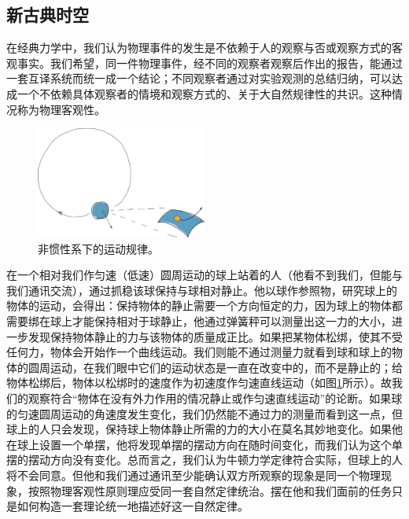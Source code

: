 \documentclass[main.tex]{subfiles}
\begin{document}
\subsection{新古典时空}
在经典力学中，我们认为物理事件的发生是不依赖于人的观察与否或观察方式的客观事实。我们希望，同一件物理事件，经不同的观察者观察后作出的报告，能通过一套互译系统而统一成一个结论；不同观察者通过对实验观测的总结归纳，可以达成一个不依赖具体观察者的情境和观察方式的、关于大自然规律性的共识。这种情况称为物理客观性\cite{Reiss2020}。

\begin{figure}[h]
    \centering
    \includegraphics[width=0.5\textwidth]{images/III.1.1.eps}
    \caption{非惯性系下的运动规律。}
    \label{fig:III.1.1}
\end{figure}

\begin{example}[“我们” vs “球上的人”]
在一个相对我们作匀速（低速）圆周运动的球上站着的人（他看不到我们，但能与我们通讯交流），通过抓稳该球保持与球相对静止。他以球作参照物，研究球上的物体的运动，会得出：保持物体的静止需要一个方向恒定的力，因为球上的物体都需要绑在球上才能保持相对于球静止，他通过弹簧秤可以测量出这一力的大小，进一步发现保持物体静止的力与该物体的质量成正比。如果把某物体松绑，使其不受任何力，物体会开始作一个曲线运动。我们则能不通过测量力就看到球和球上的物体的圆周运动，在我们眼中它们的运动状态是一直在改变中的，而不是静止的；给物体松绑后，物体以松绑时的速度作为初速度作匀速直线运动（如图\ref{fig:III.1.1}所示）。故我们的观察符合“物体在没有外力作用的情况静止或作匀速直线运动”的论断。如果球的匀速圆周运动的角速度发生变化，我们仍然能不通过力的测量而看到这一点，但球上的人只会发现，保持球上物体静止所需的力的大小在莫名其妙地变化。如果他在球上设置一个单摆，他将发现单摆的摆动方向在随时间变化，而我们认为这个单摆的摆动方向没有变化。总而言之，我们认为牛顿力学定律符合实际，但球上的人将不会同意。但他和我们通过通讯至少能确认双方所观察的现象是同一个物理现象，按照物理客观性原则理应受同一套自然定律统治。摆在他和我们面前的任务只是如何构造一套理论统一地描述好这一自然定律。
\end{example}
\end{document}
